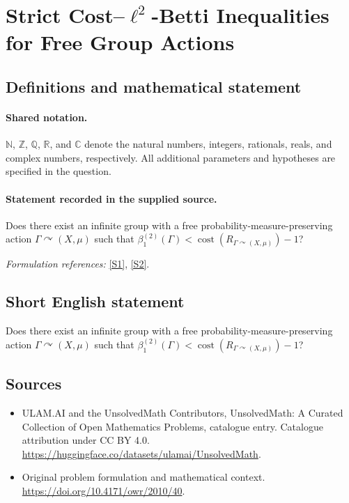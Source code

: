 \documentclass[11pt]{article}
\newcommand{\sref}[2]{\hyperlink{source:#1:#2}{[S#2]}}
\begin{document}
\section{\texorpdfstring{Strict Cost–$\ell^2$-Betti Inequalities for Free Group Actions}{Strict Cost–ell\textasciicircum{}2-Betti Inequalities for Free Group Actions}}\label{statement}

\subsection{Definitions and mathematical statement}

\paragraph{Shared notation.}$\mathbb N$, $\mathbb Z$, $\mathbb Q$, $\mathbb R$, and $\mathbb C$ denote the natural numbers, integers, rationals, reals, and complex numbers, respectively. All additional parameters and hypotheses are specified in the question.


\paragraph{Statement recorded in the supplied source.}
Does there exist an infinite group with a free probability-measure-preserving action $\Gamma\curvearrowright(X,\mu)$ such that $\beta_1^{(2)}(\Gamma)<\operatorname{cost}(R_{\Gamma\curvearrowright(X,\mu)})-1$?
\par\smallskip\textit{Formulation references:} \sref{statement}{1}, \sref{statement}{2}.
\subsection{Short English statement}
Does there exist an infinite group with a free probability-measure-preserving action $\Gamma\curvearrowright(X,\mu)$ such that $\beta_1^{(2)}(\Gamma)<\operatorname{cost}(R_{\Gamma\curvearrowright(X,\mu)})-1$?
\subsection{Sources}
\begin{itemize}
\item[\hypertarget{source:statement:1}{S1}] ULAM.AI and the UnsolvedMath Contributors, UnsolvedMath: A Curated Collection of Open Mathematics Problems, catalogue entry. Catalogue attribution under CC BY 4.0.
\url{https://huggingface.co/datasets/ulamai/UnsolvedMath}.
\item[\hypertarget{source:statement:2}{S2}] Original problem formulation and mathematical context.
\url{https://doi.org/10.4171/owr/2010/40}.
\end{itemize}
\label{end:statement}
\end{document}
